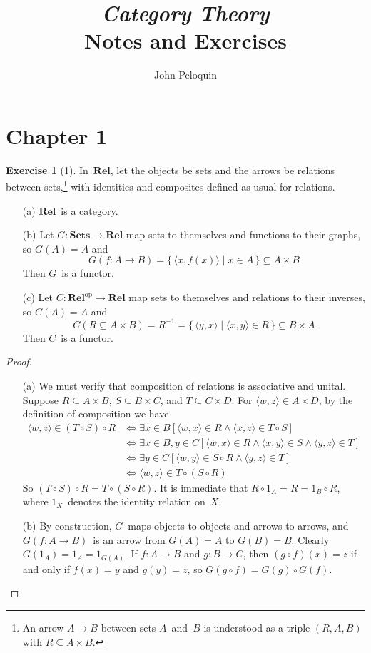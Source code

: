 \documentclass[letterpaper,12pt]{article}
\title{\textit{Category Theory}\\Notes and Exercises}
\author{John Peloquin}
\date{}
\newcommand{\Rel}{\mathbf{Rel}}
\newcommand{\Sets}{\mathbf{Sets}}
\newcommand{\after}{\circ}
\newcommand{\pair}[2]{\langle{#1},{#2}\rangle}
\newcommand{\inv}[1]{#1^{-1}}
\newcommand{\dual}[1]{#1^{\mathrm{op}}}
\theoremstyle{definition}
\newtheorem*{exer}{Exercise}
\theoremstyle{remark}
\theoremstyle{direction}
\begin{document}
\maketitle

\section*{Chapter 1}
\begin{exer}[1]
In~\(\Rel\), let the objects be sets and the arrows be relations between sets,\footnote{An arrow \(A\to B\) between sets \(A\)~and~\(B\) is understood as a triple \((R,A,B)\) with \(R\subseteq A\times B\).} with identities and composites defined as usual for relations.
\begin{enumerate}[itemsep=0pt]
\item[(a)] \(\Rel\)~is a category.
\item[(b)] Let \(G:\Sets\to\Rel\) map sets to themselves and functions to their graphs, so \(G(A)=A\) and
\[G(f:A\to B)=\{\,\pair{x}{f(x)}\mid x\in A\,\}\subseteq A\times B\]
Then \(G\)~is a functor.
\item[(c)] Let \(C:\dual{\Rel}\to\Rel\) map sets to themselves and relations to their inverses, so \(C(A)=A\) and
\[C(R\subseteq A\times B)=\inv{R}=\{\,\pair{y}{x}\mid\pair{x}{y}\in R\,\}\subseteq B\times A\]
Then \(C\)~is a functor.
\end{enumerate}
\begin{proof}\
\begin{enumerate}[itemsep=0pt]
\item[(a)] We must verify that composition of relations is associative and unital. Suppose \(R\subseteq A\times B\), \(S\subseteq B\times C\), and \(T\subseteq C\times D\). For \(\pair{w}{z}\in A\times D\), by the definition of composition we have
\begin{align*}
\pair{w}{z}\in(T\after S)\after R&\iff\exists x\in B[\pair{w}{x}\in R\land\pair{x}{z}\in T\after S]\\
								&\iff\exists x\in B,y\in C[\pair{w}{x}\in R\land\pair{x}{y}\in S\land\pair{y}{z}\in T]\\
								&\iff\exists y\in C[\pair{w}{y}\in S\after R\land\pair{y}{z}\in T]\\
								&\iff\pair{w}{z}\in T\after(S\after R)
\end{align*}
So \((T\after S)\after R=T\after(S\after R)\). It is immediate that \(R\after 1_A=R=1_B\after R\), where \(1_X\)~denotes the identity relation on~\(X\).
\item[(b)] By construction, \(G\)~maps objects to objects and arrows to arrows, and \(G(f:A\to B)\)~is an arrow from \(G(A)=A\) to \(G(B)=B\). Clearly \(G(1_A)=1_A=1_{G(A)}\). If \(f:A\to B\) and \(g:B\to C\), then \((g\after f)(x)=z\) if and only if \(f(x)=y\) and \(g(y)=z\), so \(G(g\after f)=G(g)\after G(f)\).

\end{enumerate}
\end{proof}
\end{exer}
\end{document}
